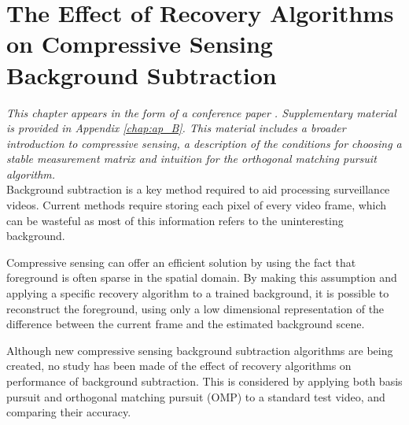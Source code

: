 
\graphicspath{{Chapter4/figures/}} 

\chapter{The Effect of Recovery Algorithms on Compressive Sensing Background Subtraction}
\label{chap:CSBGS}

\textit{This chapter appears in the form of a conference paper \citep{Davies2013}. Supplementary material is provided in Appendix \ref{chap:ap_B}. This material includes a broader introduction to compressive sensing, a description of the conditions for choosing a stable measurement matrix and  intuition for the orthogonal matching pursuit algorithm.}\\


Background subtraction is a key method required to aid processing surveillance videos. Current methods require storing each pixel of every video frame, which can be wasteful as most of this information refers to the uninteresting background. 

Compressive sensing can offer an efficient solution by using the fact that foreground is often sparse in the spatial domain. By making this assumption and applying a specific recovery algorithm to a trained background, it is possible to reconstruct the foreground, using only a low dimensional representation of the difference between the current frame and the estimated background scene. 

Although new compressive sensing background subtraction algorithms are being created, no study has been made of the effect of recovery algorithms on performance of background subtraction. This is considered by applying both basis pursuit and orthogonal matching pursuit (OMP) to a standard test video, and comparing their accuracy. 

